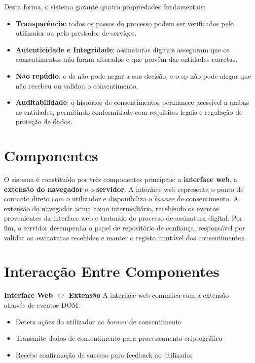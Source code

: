 Desta forma, o sistema garante quatro propriedades fundamentais: 

\begin{itemize}
    \item \textbf{Transparência}: todos os passos do processo podem ser verificados pelo utilizador ou pelo prestador de serviços.
    \item \textbf{Autenticidade e Integridade}: assinaturas digitais asseguram que os consentimentos não foram alterados e que provêm das entidades corretas.
    \item \textbf{Não repúdio}: o \acrshort{ds} não pode negar a sua decisão, e o \acrshort{sp} não pode alegar que não recebeu ou validou o consentimento.
    \item \textbf{Auditabilidade}: o histórico de consentimentos permanece acessível a ambas as entidades, permitindo conformidade com requisitos legais e regulação de proteção de dados.
\end{itemize}

\section{Componentes}

O sistema é constituído por três componentes principais: a \textbf{interface web}, a \textbf{extensão do navegador} e o \textbf{servidor}.
A interface web representa o ponto de contacto direto com o utilizador e disponibiliza o \textit{banner} de consentimento.  
A extensão do navegador actua como intermediário, recebendo os eventos provenientes da interface web e tratando do processo de assinatura digital.  
Por fim, o servidor desempenha o papel de repositório de confiança, responsável por validar as assinaturas recebidas e manter o registo imutável dos consentimentos.

\section{Interacção Entre Componentes}

\quad \textbf{Interface Web $\leftrightarrow$ Extensão}
A interface web comunica com a extensão através de eventos DOM:
\begin{itemize}
    \item Deteta ações do utilizador no \textit{banner} de consentimento
    \item Transmite dados de consentimento para processamento criptográfico
    \item Recebe confirmação de sucesso para feedback ao utilizador
\end{itemize}

